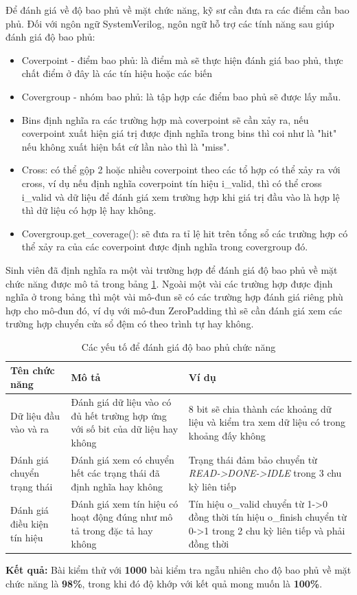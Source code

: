 Để đánh giá về độ bao phủ về mặt chức năng, kỹ sư cần đưa ra các điểm cần bao phủ. Đối với ngôn ngữ SystemVerilog, ngôn ngữ hỗ trợ các tính năng sau giúp đánh giá độ bao phủ:
\begin{itemize}
	\item Coverpoint - điểm bao phủ: là điểm mà sẽ thực hiện đánh giá bao phủ, thực chất điểm ở đây là các tín hiệu hoặc các biến
	\item Covergroup - nhóm bao phủ: là tập hợp các điểm bao phủ sẽ được lấy mẫu.
	\item Bins định nghĩa ra các trường hợp mà coverpoint sẽ cần xảy ra, nếu coverpoint xuất hiện giá trị được định nghĩa trong bins thì coi như là "hit" nếu không xuất hiện bất cứ lần nào thì là "miss".
	\item Cross: có thể gộp 2 hoặc nhiều coverpoint theo các tổ hợp có thể xảy ra với cross, ví dụ nếu định nghĩa coverpoint tín hiệu i\_valid, thì có thể cross i\_valid và dữ liệu để đánh giá xem trường hợp khi giá trị đầu vào là hợp lệ thì dữ liệu có hợp lệ hay không.
	\item Covergroup.get\_coverage(): sẽ đưa ra tỉ lệ hit trên tổng sổ các trường hợp có thể xảy ra của các coverpoint được định nghĩa trong covergroup đó.
\end{itemize}
Sinh viên đã định nghĩa ra một vài trường hợp để đánh giá độ bao phủ về mặt chức năng được mô tả trong bảng \ref{tab:myFC}. Ngoài một vài các trường hợp được định nghĩa ở trong bảng thì một vài mô-đun sẽ có các trường hợp đánh giá riêng phù hợp cho mô-đun đó, ví dụ với mô-đun ZeroPadding thì sẽ cần đánh giá xem các trường hợp chuyển cửa sổ đệm có theo trình tự hay không.

\begin{table}[H]
	\centering
	\renewcommand{\arraystretch}{1.3}
		\caption{Các yếu tố để đánh giá độ bao phủ chức năng}
	\begin{tabular}{|p{4cm} p{4cm} p{6cm}|}
		\hline
		\rowcolor{gray!30}
		\textbf{Tên chức năng} & \textbf{Mô tả}  & Ví dụ  \\
		\hline
		Dữ liệu đầu vào và ra & Đánh giá dữ liệu vào có đủ hết trường hợp ứng với số bit của dữ liệu hay không & 8 bit sẽ chia thành các khoảng dữ liệu và kiểm tra xem dữ liệu có trong khoảng đấy không
		\\ \hline
		Đánh giá chuyển trạng thái & Đánh giá xem có chuyển hết các trạng thái đã định nghĩa hay không & Trạng thái đảm bảo chuyển từ \textit{READ->DONE->IDLE} trong 3 chu kỳ liên tiếp
	
		\\ \hline
		Đánh giá điều kiện tín hiệu & Đánh giá xem tín hiệu có hoạt động đúng như mô tả trong đặc tả hay không & Tín hiệu o\_valid chuyển từ 1->0 đồng thời tín hiệu o\_finish chuyển từ 0->1 trong 2 chu kỳ liên tiếp và phải đồng thời
		\\ \hline
	\end{tabular}

	\label{tab:myFC}
\end{table}

\textbf{Kết quả: } Bài kiểm thử với \textbf{1000} bài kiểm tra ngẫu nhiên cho độ bao phủ về mặt chức năng là \textbf{98\%}, trong khi đó độ khớp với kết quả mong muốn là \textbf{100\%}.




